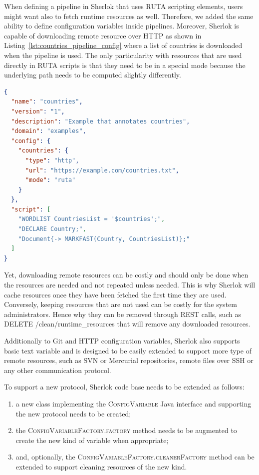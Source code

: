 \documentclass{article}
\newcommand{\ID}[1]{{\textsc{#1}}}
\newcommand{\REST}[1]{\textsf{#1}}
\begin{document}
When defining a pipeline in Sherlok that uses RUTA scripting elements, users might want also to
fetch runtime resources as well. Therefore, we added the same ability to define configuration
variables inside pipelines. Moreover, Sherlok is capable of downloading remote resource over HTTP as
shown in Listing~\ref{lst:countries_pipeline_config} where a list of countries is downloaded when
the pipeline is used. The only particularity with resources that are used directly in RUTA scripts
is that they need to be in a special mode because the underlying path needs to be computed slightly
differently.

\begin{lstlisting}[float,language=json,
                   caption=Configuration of the \ID{countries} pipeline.,
                   label=lst:countries_pipeline_config]
{
  "name": "countries",
  "version": "1",
  "description": "Example that annotates countries",
  "domain": "examples",
  "config": {
    "countries": {
      "type": "http",
      "url": "https://example.com/countries.txt",
      "mode": "ruta"
    }
  },
  "script": [
    "WORDLIST CountriesList = '$countries';",
    "DECLARE Country;",
    "Document{-> MARKFAST(Country, CountriesList)};"
  ]
}
\end{lstlisting}

Yet, downloading remote resources can be costly and should only be done when the resources are
needed and not repeated unless needed. This is why Sherlok will cache resources once they have been
fetched the first time they are used. Conversely, keeping resources that are not used can be costly
for the system administrators. Hence why they can be removed through REST calls, such as \REST{DELETE
/clean/runtime\_resources} that will remove any downloaded resources.

Additionally to Git and HTTP configuration variables, Sherlok also supports basic text variable and
is designed to be easily extended to support more type of remote resources, such as SVN or Mercurial
repositories, remote files over SSH or any other communication protocol.

To support a new protocol, Sherlok code base needs to be extended as follows:

\begin{enumerate}
    \item a new class implementing the \ID{ConfigVariable} Java interface and supporting the new
        protocol needs to be created;
    \item the \ID{ConfigVariableFactory.factory} method needs to be augmented to create the new kind of
        variable when appropriate;
    \item and, optionally, the \ID{ConfigVariableFactory.cleanerFactory} method can be extended to
        support cleaning resources of the new kind.
\end{enumerate}
\end{document}
